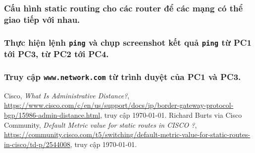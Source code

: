 \documentclass[]{article}
\begin{document}
\subsubsection{Cấu hình static routing cho các router để các mạng có thể giao tiếp với nhau.}
\subsubsection{Thực hiện lệnh \texttt{ping} và chụp screenshot kết quả \texttt{ping} từ PC1 tới PC3, từ PC2 tới PC4.}
\subsubsection{Truy cập \texttt{www.network.com} từ trình duyệt của PC1 và PC3.}

\begin{thebibliography}{10}
Cisco, \textit{What Is Administrative Distance?}, \href{https://www.cisco.com/c/en/us/support/docs/ip/border-gateway-protocol-bgp/15986-admin-distance.html}{https://www.cisco.com/c/en/us/support/docs/ip/border-gateway-protocol-bgp/15986-admin-distance.html}, truy cập \today.
Richard Burts via Cisco Community, \textit{Default Metric value for static routes in CISCO ?}, \href{https://community.cisco.com/t5/switching/default-metric-value-for-static-routes-in-cisco/td-p/2544008}{https://community.cisco.com/t5/switching/default-metric-value-for-static-routes-in-cisco/td-p/2544008}, truy cập \today.
\end{thebibliography}
\end{document}
